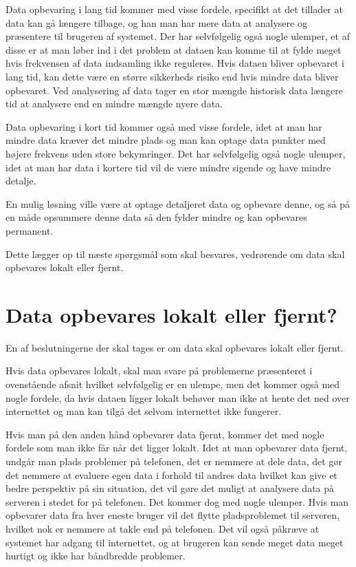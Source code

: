 Data opbevaring i lang tid kommer med visse fordele, specifikt at det tillader at data kan gå længere tilbage, og han man har mere data at analysere og præsentere til brugeren af systemet. 
Der har selvfølgelig også nogle ulemper, et af disse er at man løber ind i det problem at dataen kan komme til at fylde meget hvis frekvensen af data indsamling ikke reguleres. 
Hvis dataen bliver opbevaret i lang tid, kan dette være en større sikkerheds risiko end hvis mindre data bliver opbevaret. %
Ved analysering af data tager en stor mængde historisk data længere tid at analysere end en mindre mængde nyere data. %

Data opbevaring i kort tid kommer også med visse fordele, idet at man har mindre data kræver det mindre plads og man kan optage data punkter med højere frekvens uden store bekymringer. %
Det har selvfølgelig også nogle ulemper, idet at man har data i kortere tid vil de være mindre sigende og have mindre detalje. %

En mulig løsning ville være at optage detaljeret data og opbevare denne, og så på en måde opsummere denne data så den fylder mindre og kan opbevares permanent. %

Dette lægger op til næste spørgsmål som skal besvares, vedrørende om data skal opbevares lokalt eller fjernt.

\section{Data opbevares lokalt eller fjernt?}
En af beslutningerne der skal tages er om data skal opbevares lokalt eller fjernt. 

Hvis data opbevares lokalt, skal man svare på problemerne præsenteret i ovenstående afsnit hvilket selvfølgelig er en ulempe, men det kommer også med nogle fordele, da hvis dataen ligger lokalt behøver man ikke at hente det ned over internettet og man kan tilgå det selvom internettet ikke fungerer.

Hvis man på den anden hånd opbevarer data fjernt, kommer det med nogle fordele som man ikke får når det ligger lokalt. Idet at man opbevarer data fjernt, undgår man plads problemer på telefonen, det er nemmere at dele data, det gør det nemmere at evaluere egen data i forhold til andres data hvilket kan give et bedre perspektiv på sin situation, det vil gøre det muligt at analysere data på serveren i stedet for på telefonen. 
Det kommer dog med nogle ulemper. Hvis man opbevarer data fra hver eneste bruger vil det flytte pladsproblemet til serveren, hvilket nok er nemmere at takle end på telefonen. Det vil også påkræve at systemet har adgang til internettet, og at brugeren kan sende meget data meget hurtigt og ikke har båndbredde problemer. 



